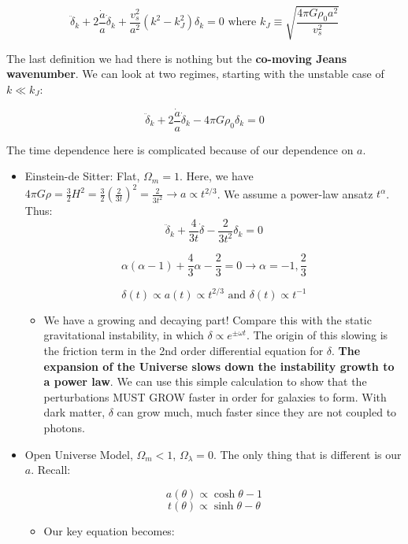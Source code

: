 \documentclass{article}
\newcommand{\be}{\begin{equation}}
\newcommand{\ee}{\end{equation}}
\begin{document}
\be
\ddot{\delta}_k + 2\frac{\dot{a}}{a}\dot{\delta}_k + \frac{v_s^2}{a^2} \left(k^2 - k_J^2\right)\delta_k = 0 \text{ where } k_J \equiv \sqrt{\frac{4\pi G \rho_0 a^2}{v_s^2}}
\ee

The last definition we had there is nothing but the \textbf{co-moving Jeans wavenumber}. We can look at two regimes, starting with the unstable case of $k \ll k_J$:

\be
\ddot{\delta}_k + 2\frac{\dot{a}}{a}\dot{\delta}_k - 4 \pi G\rho_0 \delta_k = 0
\ee

The time dependence here is complicated because of our dependence on $a$.

\begin{itemize}
    \item Einstein-de Sitter: Flat, $\Omega_m =1$. Here, we have $4\pi G \rho = \frac32 H^2  = \frac32 \left(\frac{2}{3t}\right)^2 = \frac{2}{3t^2} \rightarrow a \propto t^{2/3}$. We assume a power-law ansatz $t^\alpha$. Thus:
    \be
    \ddot{\delta}_k + \frac{4}{3t} \dot{\delta} - \frac{2}{3t^2} \delta_k = 0
    \ee
    
    \be
    \alpha\left(\alpha -1\right) + \frac43 \alpha - \frac23 = 0 \rightarrow \alpha = -1, \frac23
    \ee
    
    \be
    \boxed{\delta\left(t\right) \propto a(t) \propto t^{2/3}} \text{ and } \boxed{\delta(t) \propto t^{-1}}
    \ee
    \begin{itemize}
        \item We have a growing and decaying part! Compare this with the static gravitational instability, in which $\delta \propto e^{\pm \omega t}$. The origin of this slowing is the friction term in the 2nd order differential equation for $\delta$. \textbf{The expansion of the Universe slows down the instability growth to a  power law}. We can use this simple calculation to show that the perturbations MUST GROW faster in order for galaxies to form. With dark matter, $\delta$ can grow much, much faster since they are not coupled to photons. 
    \end{itemize}
    
    \item Open Universe Model, $\Omega_m < 1$, $\Omega_\lambda = 0$. The only thing that is different is our $a$. Recall:
    
    \be
    a(\theta) \propto \cosh \theta -1
    \ee
    \be
    t(\theta) \propto \sinh\theta - \theta
    \ee
    
    \begin{itemize}
        \item Our key equation becomes:
        

\end{itemize}
\end{itemize}
\end{document}
